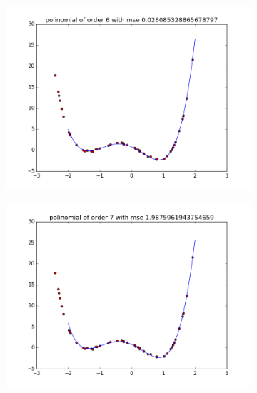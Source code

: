 \documentclass{article}
\begin{document}
\begin{figure}
\centering
        \begin{subfigure}[b]{0.48\textwidth}
                \centering
                \includegraphics[width=\linewidth]{poli-order-6}
        \end{subfigure}\hfill
        \begin{subfigure}[b]{0.48\textwidth}
                \centering
                \includegraphics[width=\linewidth]{poli-order-7}
        \end{subfigure}\hfill
        \label{fig:5}
 \end{figure}
       
\end{document}
